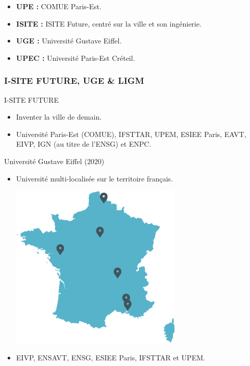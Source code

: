 \documentclass[]{beamer}
\begin{document}
\begin{frame}
  \begin{itemize}
    \item
    {\bf UPE :}  COMUE Paris-Est.
    \item
    {\bf ISITE :}  ISITE Future, centré sur la ville et son ingénierie.
    \item
    {\bf UGE :}  Université Gustave Eiffel.
    \item
    {\bf UPEC :}  Université Paris-Est Créteil.
  \end{itemize}

\end{frame}


\begin{frame}
  \frametitle{I-SITE FUTURE, UGE \& LIGM}

  \begin{block}{I-SITE FUTURE}
    \begin{itemize}
      \item
      Inventer la ville de demain.

      \item
      Université Paris-Est (COMUE), IFSTTAR, UPEM, ESIEE Paris, EAVT,
      EIVP, IGN (au titre de l’ENSG) et ENPC.
    \end{itemize}
  \end{block}

  \begin{block}{Université Gustave Eiffel (2020)}
    \begin{itemize}
      \item
      Université multi-localisée sur le territoire français.

      \begin{center}
          \includegraphics[scale=.25]{pictures/carte_sitesUC.png}
      \end{center}

      \item
      EIVP, ENSAVT, ENSG, ESIEE Paris, IFSTTAR et UPEM.
    \end{itemize}
  \end{block}
\end{frame}
\end{document}

